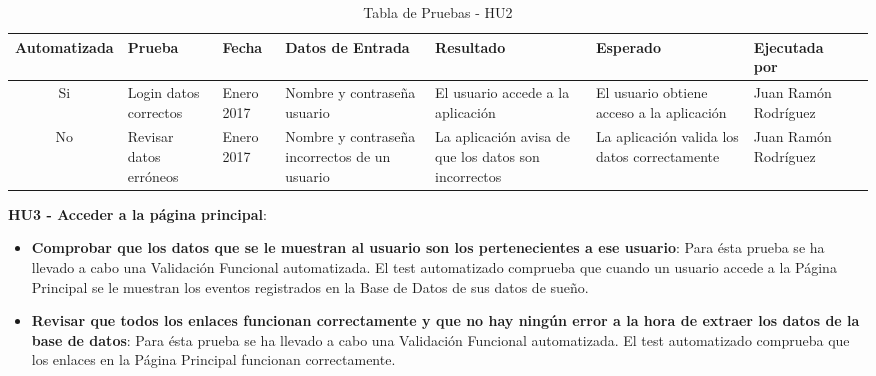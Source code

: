 \documentclass[11pt,openany]{book}
\begin{document}
{\tiny
\setlength{\LTleft}{-20cm plus -1fill}
\setlength{\LTright}{\LTleft}
\begin{center}
\begin{longtable}{| c | M{1.5cm} | M{1.5cm} | M{2.5cm} | M{1.5cm} | M{1.5cm} | M{1.5cm} | M{1.5cm} |}
\caption[Tabla de Pruebas - HU2]{Tabla de Pruebas - HU2} \label{grid_mlmmh} \\

\hline Automatizada & Prueba & Fecha & Datos de Entrada & Resultado & Esperado & Ejecutada por \\
\endfirsthead
\hline
Si & Login datos correctos & Enero 2017 & Nombre y contraseña usuario & El usuario accede a la aplicación & El usuario obtiene acceso a la aplicación & Juan Ramón Rodríguez \\
\hline
No & Revisar datos erróneos & Enero 2017 & Nombre y contraseña incorrectos de un usuario & La aplicación avisa de que los datos son incorrectos & La aplicación valida los datos correctamente & Juan Ramón Rodríguez \\
\hline
\end{longtable}
\end{center}}

\textbf{HU3 - Acceder a la página principal}:
 
\begin{itemize}
\item\textbf{Comprobar que los datos que se le muestran al usuario son los pertenecientes a ese usuario}: Para ésta prueba se ha llevado a cabo una Validación Funcional automatizada. El test automatizado comprueba que cuando un usuario accede a la Página Principal se le muestran los eventos registrados en la Base de Datos de sus datos de sueño.
\item\textbf{Revisar que todos los enlaces funcionan correctamente y que no hay ningún error a la hora de extraer los datos de la base de datos}: Para ésta prueba se ha llevado a cabo una Validación Funcional automatizada. El test automatizado comprueba que los enlaces en la Página Principal funcionan correctamente.
\end{itemize}
\end{document}
